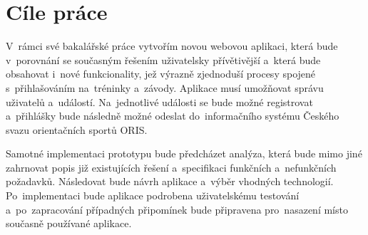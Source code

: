 \section{Cíle práce}
V~rámci své bakalářské práce vytvořím novou webovou aplikaci, která bude v~porovnání se současným řešením uživatelsky přívětivější a~která bude obsahovat i~nové funkcionality, jež výrazně zjednoduší procesy spojené s~přihlašováním na~tréninky a~závody. Aplikace musí umožňovat správu uživatelů a~událostí. Na~jednotlivé události se bude možné registrovat a~přihlášky bude následně možné odeslat do~informačního systému Českého svazu orientačních sportů ORIS.

Samotné implementaci prototypu bude předcházet analýza, která bude mimo jiné zahrnovat popis již existujících řešení a~specifikaci funkčních a~nefunkčních požadavků. Následovat bude návrh aplikace a~výběr vhodných technologií. Po~implementaci bude aplikace podrobena uživatelskému testování a~po~zapracování případných připomínek bude připravena pro~nasazení místo současně používané aplikace.
